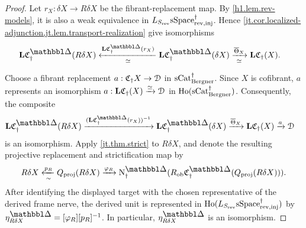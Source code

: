 \documentclass[a4paper,dvipdfmx,11pt]{amsart}
\begin{document}
\begin{proof}
  Let $r_X: \delta X \to R\delta X$ be the fibrant-replacement map.
  By \cref{h1.lem.rev-models}, it is also a weak equivalence in $L_{S_{\mathrm{rev}}}\mathrm{sSpace}^{\dag}_{\mathrm{rev},\mathrm{inj}}$.
  Hence \cref{jt.cor.localized-adjunction,jt.lem.transport-realization} give isomorphisms
  \begin{align}
    \bfL\frakC^{\prism}_{\dag}(R\delta X)
    &\xleftarrow[\simeq]{\bfL\frakC^{\prism}_{\dag}(r_X)}
    \bfL\frakC^{\prism}_{\dag}(\delta X)
    \xrightarrow[\simeq]{\overline\Theta_X}
    \bfL\frakC_{\dag}(X).
  \end{align}

  Choose a fibrant replacement $a : \mathfrak{C}_{\dag}X \to \mathcal{D}$ in $\mathrm{sCat}^{\dag}_{\mathrm{Bergner}}$.
  Since $X$ is cofibrant, $a$ represents an isomorphism $a : \mathbf{L}\mathfrak{C}_{\dag}(X) \xrightarrow{\simeq} \mathcal{D}$ in $\mathrm{Ho}(\mathrm{sCat}^{\dag}_{\mathrm{Bergner}})$.
  Consequently, the composite
  \begin{align}\label{jt.eq.unit-realization-comparison}
    \bfL\frakC^{\prism}_{\dag}(R\delta X)
    &\xrightarrow{
      (\bfL\frakC^{\prism}_{\dag}(r_X))^{-1}
    }
    \bfL\frakC^{\prism}_{\dag}(\delta X)
    \xrightarrow{\overline\Theta_X}
    \bfL\frakC_{\dag}(X)
    \xrightarrow{a}
    \calD
  \end{align}
  is an isomorphism.
  Apply \cref{jt.thm.strict} to $R\delta X$, and denote the resulting projective replacement and strictification map by
  \begin{align}
    R\delta X
    \xleftarrow[\sim]{p_R}
    Q_{\proj}(R\delta X)
    \xrightarrow{\varphi_R}
    \N^{\prism}_{\dag}(R_{\rmob}\frakC^{\prism}_{\dag}(Q_{\proj}(R\delta X))).
  \end{align}
  After identifying the displayed target with the chosen representative of the derived frame nerve, the derived unit is represented in $\mathrm{Ho}(L_{S_{\mathrm{rev}}}\mathrm{sSpace}^{\dag}_{\mathrm{rev},\mathrm{inj}})$ by $\eta^{\prism}_{R\delta X} = [\varphi_R][p_R]^{-1}$.
  In particular, $\eta^{\prism}_{R\delta X}$ is an isomorphism.


\end{proof}
\end{document}
